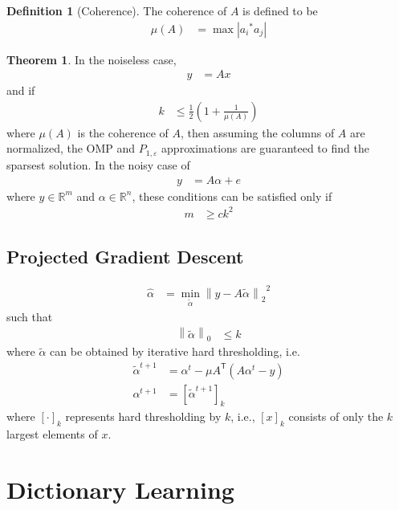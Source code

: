 \documentclass[titlepage, fleqn, a4paper, 12pt, twoside]{article}
\theoremstyle{definition}
\newtheorem{definition}{Definition}
\theoremstyle{theorem}
\newtheorem{theorem}{Theorem}
\renewcommand{\tilde}{\widetilde}
\def\transpose#1{{#1}^{\mathsf{T}}}
\begin{document}
\begin{definition}[Coherence]
	The coherence of $A$ is defined to be
	\begin{align*}
		\mu(A) &= \max\left| {a_i}^* a_j \right|
	\end{align*}
\end{definition}

\begin{theorem}
	In the noiseless case,
	\begin{align*}
		y &= A x
	\end{align*}
	and if
	\begin{align*}
		k &\le \frac{1}{2} \left( 1 + \frac{1}{\mu(A)} \right)
	\end{align*}
	where $\mu(A)$ is the coherence of $A$, then assuming the columns of $A$ are normalized, the OMP and $P_{1,\varepsilon}$ approximations are guaranteed to find the sparsest solution.
	In the noisy case of
	\begin{align*}
		y &= A \alpha + e
	\end{align*}
	where $y \in \mathbb{R}^m$ and $\alpha \in \mathbb{R}^n$, these conditions can be satisfied only if
	\begin{align*}
		m &\ge c k^2
	\end{align*}
\end{theorem}

\subsection{Projected Gradient Descent}

\begin{align*}
	\hat{\alpha} &= \min\limits_{\tilde{\alpha}} {\left\| y - A \tilde{\alpha} \right\|_2}^2
\end{align*}
such that
\begin{align*}
	\left\| \tilde{\alpha} \right\|_0 &\le k
\end{align*}
where $\tilde{\alpha}$ can be obtained by iterative hard thresholding, i.e.
\begin{align*}
	{\tilde{\alpha}}^{t + 1} &= \alpha^t - \mu \transpose{A} \left( A \alpha^t - y \right)\\
	\alpha^{t + 1} &= [{\tilde{\alpha}}^{t + 1}]_k
\end{align*}
where $[ \cdot ]_k$ represents hard thresholding by $k$, i.e., $[x]_k$ consists of only the $k$ largest elements of $x$.

\section{Dictionary Learning}
\end{document}
